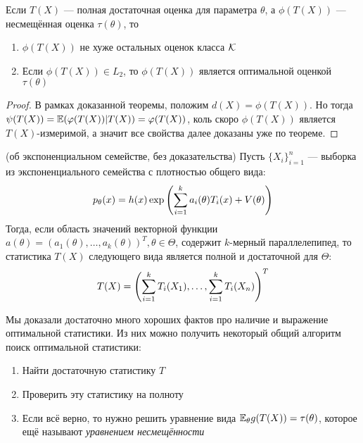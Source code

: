 \begin{corollary}
	Если $T(X)$ --- полная достаточная оценка для параметра $\theta$, а $\phi(T(X))$ --- несмещённая оценка $\tau(\theta)$, то
	\begin{enumerate}
		\item $\phi(T(X))$ не хуже остальных оценок класса $\mathcal{K}$
		
		\item Если $\phi(T(X)) \in L_2$, то $\phi(T(X))$ является оптимальной оценкой $\tau(\theta)$
	\end{enumerate}
\end{corollary}

\begin{proof}
	В рамках доказанной теоремы, положим $d(X) = \phi(T(X))$. Но тогда $\psi(T(X)) = \mathbb{E}(\varphi(T(X)) | T(X)) = \varphi(T(X))$, коль скоро $\phi(T(X))$ является $T(X)$-измеримой, а значит все свойства далее доказаны уже по теореме.
\end{proof}

\begin{theorem} (об экспоненциальном семействе, без доказательства)
	Пусть $\{X_i\}_{i = 1}^n$ --- выборка из экспоненциального семейства с плотностью общего вида:
	\[
		p_\theta(x) = h(x)\exp\left(\sum_{i = 1}^k a_i(\theta)T_i(x) + V(\theta)\right)
	\]
	Тогда, если область значений векторной функции $a(\theta) = (a_1(\theta), \ldots, a_k(\theta))^T, \theta \in \Theta$, содержит $k$-мерный параллелепипед, то статистика $T(X)$ следующего вида является полной и достаточной для $\Theta$:
	\[
		T(X) = \left(\sum_{i = 1}^k T_i(X_1), \ldots, \sum_{i = 1}^k T_i(X_n)\right)^T
	\]
\end{theorem}

\begin{note}
	Мы доказали достаточно много хороших фактов про наличие и выражение оптимальной статистики. Из них можно получить некоторый общий алгоритм поиск оптимальной статистики:
	\begin{enumerate}
		\item Найти достаточную статистику $T$
		
		\item Проверить эту статистику на полноту
		
		\item Если всё верно, то нужно решить уравнение вида $\mathbb{E}_\theta g(T(X)) = \tau(\theta)$, которое ещё называют \textit{уравнением несмещённости}
	\end{enumerate}
\end{note}

